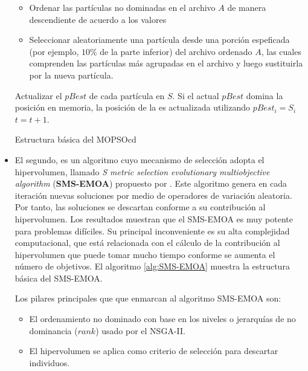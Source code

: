 \begin{itemize}
\begin{algorithm}
\begin{algorithmic}[1]
\begin{itemize}
	       \item Ordenar las part\'iculas no dominadas en el archivo $A$ de manera descendiente de acuerdo a los valores 
	       \item Seleccionar aleatoriamente una part\'icula desde una porci\'on espeficada (por ejemplo, $10\%$ de la parte inferior) 
	       del archivo ordenado $A$, las cuales comprenden las part\'iculas m\'as agrupadas en el archivo y luego sustituirla por la 
	       nueva part\'icula.
	      \end{itemize}	  
	  \STATE Actualizar el $pBest$ de cada part\'icula en $S$. Si el actual $pBest$ domina la posici\'on en memoria, la posici\'on de la 
	  es actualizada utilizando $pBest_i = S_i$
	  \STATE $t = t + 1$.
	\ENDWHILE
      \end{algorithmic}
  \caption{Estructura b\'asica del MOPSOcd}
  \label{alg:MOPSOcd}
  \end{algorithm}
 
 
  \item El segundo, es un algoritmo cuyo mecanismo de selecci\'on adopta el hipervolumen, llamado \textit{S metric selection 
  evolutionary multiobjective algorithm} (\textbf{SMS-EMOA}) propuesto 
  por \cite{Beume07}. Este algoritmo genera en cada iteraci\'on nuevas soluciones por medio de operadores de variaci\'on aleatoria. 
  Por tanto, las soluciones se descartan conforme a su contribuci\'on al hipervolumen. Los resultados muestran que el SMS-EMOA es muy 
  potente para problemas dif\'iciles. Su principal inconveniente es su alta complejidad computacional, que est\'a relacionada con el 
  c\'alculo de la contribuci\'on al hipervolumen que puede tomar mucho tiempo conforme se aumenta el n\'umero de objetivos.
   El algoritmo \ref{alg:SMS-EMOA} muestra la estructura b\'asica del SMS-EMOA.

   Los pilares principales que que enmarcan al algoritmo SMS-EMOA son:
   
   \begin{itemize}
    \item El ordenamiento no dominado con base en los niveles o jerarqu\'ias de no dominancia ($rank$) usado por el NSGA-II.
    \item El hipervolumen se aplica como criterio de selecci\'on para descartar individuos.
   \end{itemize}
  

\end{itemize}

